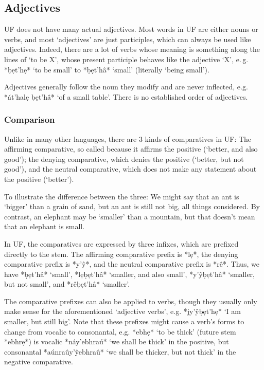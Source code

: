 \documentclass[a4paper, 12pt, oneside, final]{article}
\begin{document}
\subsection{Adjectives}
UF does not have many actual adjectives. Most words in UF are either nouns or verbs, and most ‘adjectives’ are just
participles, which can always be used like adjectives. Indeed, there are a lot of verbs whose meaning is something
along the lines of ‘to be X’, whose present participle behaves like the adjective ‘X’, e.\,g. *ḅẹt’hẹ* ‘to be small’
to *ḅẹt’hâ* ‘small’ (literally ‘being small’).

Adjectives generally follow the noun they modify and are never inflected, e.g. *át’halẹ ḅẹt’hâ* ‘of a small table’.
There is no established order of adjectives.

\subsubsection{Comparison}
Unlike in many other languages, there are 3 kinds of comparatives in UF: The affirming comparative, so called
because it affirms the positive (‘better, and also good’); the denying comparative, which denies the positive
(‘better, but not good’), and the neutral comparative, which does not make any statement about the positive
(‘better’).

To illustrate the difference between the three: We might say that an ant is ‘bigger’ than a grain of sand, but
an ant is still not big, all things considered. By contrast, an elephant may be ‘smaller’ than a mountain,
but that doesn’t mean that an elephant is small.

In UF, the comparatives are expressed by three infixes, which are prefixed directly to the stem. The affirming
comparative prefix is *lẹ*, the denying comparative prefix is *y’ŷ*, and the neutral comparative prefix is *rê*.
Thus, we have *ḅẹt’hâ* ‘small’, *lẹḅẹt’hâ* ‘smaller, and also small’, *y’ŷḅẹt’hâ* ‘smaller, but not small’, and
*rêḅẹt’hâ* ‘smaller’.

The comparative prefixes can also be applied to verbs, though they usually only make sense for the aforementioned
‘adjective verbs’, e.g. *jy’ŷḅẹt’hẹ* ‘I am smaller, but still big’. Note that these prefixes
might cause a verb’s forms to change from vocalic to consonantal, e.g. *ebhẹ* ‘to be thick’ (future stem *ebhrẹ*)
is vocalic *náy’ebhraú* ‘we shall be thick’ in the positive, but consonantal *aúnraûy’ŷebhraû* ‘we shall be
thicker, but not thick’ in the negative comparative.
\end{document}
